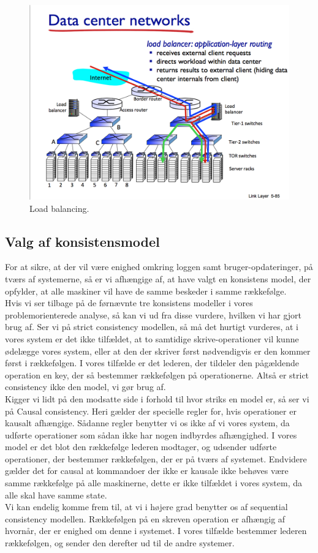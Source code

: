\documentclass[a4paper,12pt]{article}
\begin{document}
\begin{figure}[H]
  \caption{Load balancing.}
  \centering
    \includegraphics[width=1\textwidth]{Loadbalancing}
\end{figure}

\subsection{Valg af konsistensmodel}
For at sikre, at der vil være enighed omkring loggen samt bruger-opdateringer, på tværs af systemerne, så er vi afhængige af, at have valgt en konsistens model, der opfylder, at alle maskiner vil have de samme beskeder i samme rækkefølge.
\\[5px]
Hvis vi ser tilbage på de førnævnte tre konsistens modeller i vores problemorienterede analyse, så kan vi ud fra disse vurdere, hvilken vi har gjort brug af.
Ser vi på strict consistency modellen, så må det hurtigt vurderes, at i vores system er det ikke tilfældet, at to samtidige skrive-operationer vil kunne ødelægge vores system, eller at den der skriver først nødvendigvis er den kommer først i rækkefølgen. I vores tilfælde er det lederen, der tildeler den pågældende operation en key, der så bestemmer rækkefølgen på operationerne.
Altså er strict consistency ikke den model, vi gør brug af.
\\[5px]
Kigger vi lidt på den modsatte side i forhold til hvor striks en model er, så ser vi på Causal consistency. Heri gælder der specielle regler for, hvis operationer er kausalt afhængige. Sådanne regler benytter vi os ikke af vi vores system, da udførte operationer som sådan ikke har nogen indbyrdes afhængighed. I vores model er det blot den rækkefølge lederen modtager, og udsender udførte operationer, der bestemmer rækkefølgen, der er på tværs af systemet.
Endvidere gælder det for causal at kommandoer der ikke er kausale ikke behøves være samme rækkefølge på alle maskinerne, dette er ikke tilfældet i vores system, da alle skal have samme state.
\\[5px]
Vi kan endelig komme frem til, at vi i højere grad benytter os af sequential consistency modellen. Rækkefølgen på en skreven operation er afhængig af hvornår, der er enighed om denne i systemet. I vores tilfælde bestemmer lederen rækkefølgen, og sender den derefter ud til de andre systemer.
\end{document}
